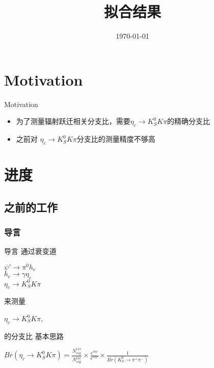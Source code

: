 \documentclass{beamer}
\title[拟合结果]{拟合结果}
\date{\today}
\begin{document}
\begin{frame}
\titlepage
\end{frame}


\section{Motivation}
\begin{frame}{Motivation}
\begin{itemize}
\item 为了测量辐射跃迁相关分支比，需要$\eta_c \to K_S^0 K \pi$的精确分支比\\
\item 之前对 $\eta_c \to K_S^0 K \pi$分支比的测量精度不够高\\
\end{itemize}
\end{frame}

\section{进度}
\subsection{之前的工作}
\subsubsection{导言}
\begin{frame}{导言}
通过衰变道
\begin{center}
$\psi\prime\to\pi^0h_c$\\
$h_c\to\gamma\eta_c$\\
$\eta_c \to K_S^0 K \pi$\\
\end{center}
来测量\\
\begin{center}
$\eta_c \to K_S^0 K \pi$,\\
\end{center}
的分支比
\bigskip
基本思路
        \begin{center}
$Br(\eta_c\to K^0_S K \pi) = 
\frac{ N^{exc}_{sig} }{ N^{inc}_{sig} } 
\times \frac{ \epsilon^{inc} }{ \epsilon^{exc} }
\times \frac{ 1 }{ Br(K^0_S\to\pi^+\pi^-) }
$
\end{center}
\end{frame}
\end{document}
